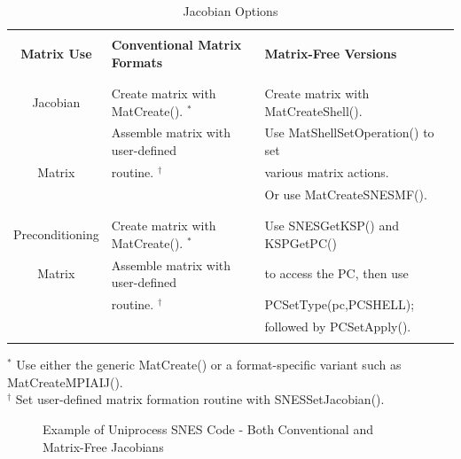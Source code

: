 \begin{center}
\begin{table}[H]
\begin{tabular}{|c|l|l|} \hline
& & \\
{\bf Matrix Use}      & {\bf Conventional Matrix Formats}          & {\bf Matrix-Free Versions}\\ 
& & \\ \hline
& & \\
Jacobian        & Create matrix with MatCreate(). $ ^* $ & Create matrix with MatCreateShell().\\
               & Assemble matrix with user-defined     & Use MatShellSetOperation() to set\\
Matrix          & routine. $ ^\dagger $                         & various matrix actions.\\
                &                                    & Or use MatCreateSNESMF().\\
& & \\ \hline
& & \\
Preconditioning  & Create matrix with MatCreate(). $ ^* $ & Use SNESGetKSP() and KSPGetPC() \\
Matrix           & Assemble matrix with user-defined & to access the PC, then use\\
                & routine. $ ^\dagger $         & PCSetType(pc,PCSHELL);\\ 
                &             & followed by PCSetApply(). \\

& & \\ \hline
\end{tabular}

\medskip
$ ^* $ Use either the generic MatCreate() or a format-specific variant
   such as MatCreateMPIAIJ().\\
$ ^\dagger $ Set user-defined matrix formation routine with SNESSetJacobian().
\medskip
\caption{Jacobian Options}
\label{tab_jacobians}
\end{table}
\end{center}

\begin{figure}[H]
{\small
{}
}
\caption{Example of Uniprocess SNES Code - Both Conventional and Matrix-Free Jacobians}
\label{fig_snesexample2}
\end{figure} 

